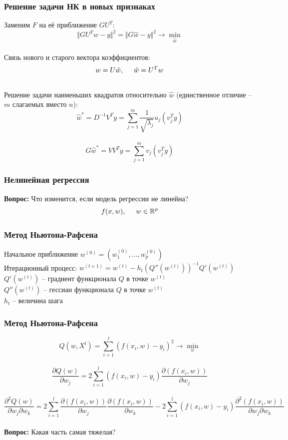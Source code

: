 \documentclass[10pt]{beamer}
\begin{document}
\begin{frame}\frametitle{Решение задачи НК в новых признаках}
Заменим $F$ на её приближение $GU^T$:\\
$$\Vert GU^Tw -y \Vert^2 = \Vert G\hat{w} -y \Vert^2 \rightarrow \min\limits_{\hat{w}}$$\\
Связь нового и старого вектора коэффициентов:\\
$$w = U\hat{w}, \hspace{5mm} \hat{w} = U^T w$$\\
Решение задачи наименьших квадратов относительно $\hat{w}$ (единственное отличие -- $m$ слагаемых вместо $n$):\\
$$\hat{w}^* = D^{-1}V^Ty = \sum\limits_{j=1}^m \frac{1}{\sqrt{\lambda_j}} u_j (v_j^Ty)$$\\
$$G\hat{w}^* = VV^Ty = \sum\limits_{j=1}^m v_j (v_j^Ty)$$
\end{frame}

\begin{frame}\frametitle{Нелинейная регрессия}
\textbf{Вопрос:} Что изменится, если модель регрессии не линейна?\\
\vspace{5mm}
$$f(x, w), \hspace{5mm} w \in \mathbb{R}^p$$
\end{frame}


\begin{frame}\frametitle{Метод Ньютона-Рафсена}
Начальное приближение $w^{(0)} = (w_1^{(0)}, \dots, w_p^{(0)})$\\
Итерационный процесс: $w^{(t+1)} = w^{(t)} - h_t (Q''(w^{(t)}))^{-1}Q'(w^{(t)})$\\
\vspace{5mm}
$Q'(w^{(t)})$ -- градиент функционала $Q$ в точке $w^{(t)}$\\
$Q''(w^{(t)})$ -- гессиан функционала $Q$ в точке $w^{(t)}$\\
$h_t$ -- величина шага
\end{frame}

\begin{frame}\frametitle{Метод Ньютона-Рафсена}
$$Q(w,X^l) = \sum\limits_{i=1}^l (f (x_i, w) - y_i)^2 \rightarrow \min\limits_{w}$$\\

$$\frac{\partial Q(w)}{\partial w_j} = 2 \sum\limits_{i=1}^l (f(x_i, w) - y_i ) \frac{\partial(f(x_i, w))}{\partial w_j}$$\\
$$\frac{\partial^2 Q(w)}{\partial w_j \partial w_k} = 2 \sum\limits_{i=1}^l \frac{\partial(f(x_i, w))}{\partial w_j} \frac{\partial(f(x_i, w))}{\partial w_k} - 2 \sum\limits_{i=1}^l (f(x_i, w) - y_i ) \frac{\partial^2 (f(x_i, w))}{\partial w_j \partial w_k}$$\\
\vspace{5mm}
\textbf{Вопрос:} Какая часть самая тяжелая?
\end{frame}
\end{document}
